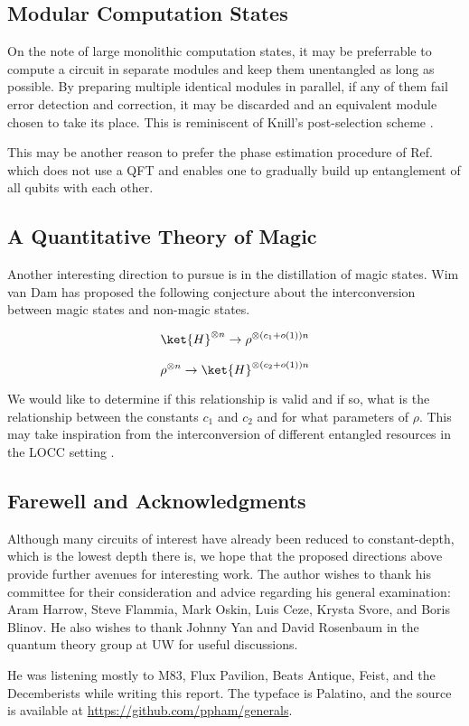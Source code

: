 \subsection{Modular Computation States}

On the note of large monolithic computation states, it may be preferrable
to compute a circuit in separate modules and keep them unentangled as long
as possible. By preparing multiple identical modules in parallel, if any
of them fail error detection and correction, it may be discarded and an
equivalent module chosen to take its place. This is reminiscent of
Knill's post-selection scheme \cite{Knill2004}.

This may be another reason to prefer the phase estimation procedure of
Ref. \cite{Kitaev2002} which does not use a QFT and enables one to gradually
build up entanglement of all qubits with each other.

\subsection{A Quantitative Theory of Magic}

Another interesting direction to pursue is in the distillation of magic
states. 
Wim van Dam has proposed the following conjecture about the interconversion
between
magic states and non-magic states.

\begin{equation}
\ket{H}^{\otimes n} \rightarrow \rho^{\otimes (c_1 + o(1))n}
\end{equation}

\begin{equation}
\rho^{\otimes n} \rightarrow \ket{H}^{\otimes (c_2 + o(1))n}
\end{equation}

We would like to determine if this relationship is valid and if so,
what is the relationship between the constants $c_1$
and $c_2$ and for what parameters of $\rho$. This may take inspiration
from the interconversion of different entangled resources in the LOCC
setting \cite{Ambainis2002}.

\subsection{Farewell and Acknowledgments}

Although many circuits of interest have already been reduced to constant-depth,
which is the lowest depth there is, we hope that the proposed directions above
provide further avenues for interesting work. The author wishes to thank his
committee for their consideration and advice regarding his general examination:
Aram Harrow, Steve Flammia, Mark Oskin,
Luis Ceze, Krysta Svore, and Boris Blinov. He also wishes to thank Johnny Yan
and David Rosenbaum in the quantum theory group at UW for useful discussions.

He was listening mostly to M83, Flux Pavilion, Beats Antique, Feist,
and the Decemberists while writing this report. The typeface
is Palatino, and the source is available at \url{https://github.com/ppham/generals}.